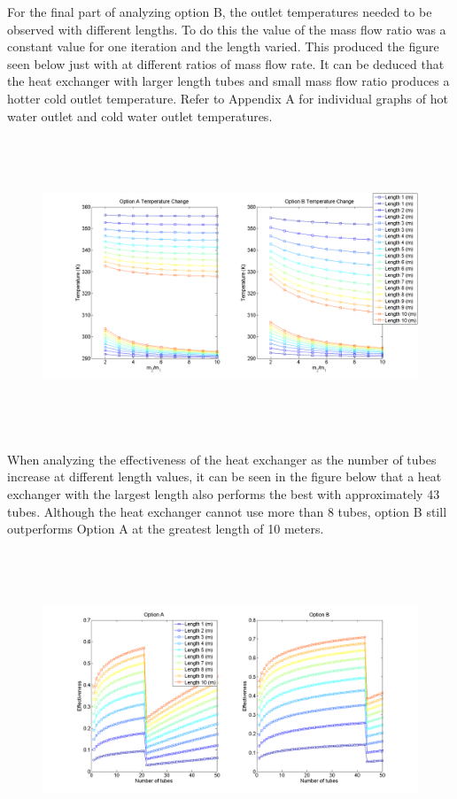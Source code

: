 %
\noindent
For the final part of analyzing option B, the outlet temperatures needed to be observed with different lengths. To do this the value of the mass flow ratio was a constant value for one iteration and the length varied. This produced the figure seen below just with at different ratios of mass flow rate. It can be deduced that the heat exchanger with larger length tubes and small mass flow ratio produces a hotter cold outlet temperature. Refer to Appendix A for individual graphs of hot water outlet and cold water outlet temperatures. 
%
\begin{figure}[H]
    \centering
    \label{fig_part_4_temps}
    \includegraphics[height=3.5in]{pictures/part_4_total_temp_lengths.png}
\end{figure}
%
\noindent
When analyzing the effectiveness of the heat exchanger as the number of tubes increase at different length values, it can be seen in the figure below that a heat exchanger with the largest length also performs the best with approximately 43 tubes. Although the heat exchanger cannot use more than 8 tubes, option B still outperforms Option A at the greatest length of 10 meters.
%
\begin{figure}[H]
    \centering
    \includegraphics[height=3.5in]{pictures/part_4_tubes_effectiveness_length.png}
\end{figure}
%
